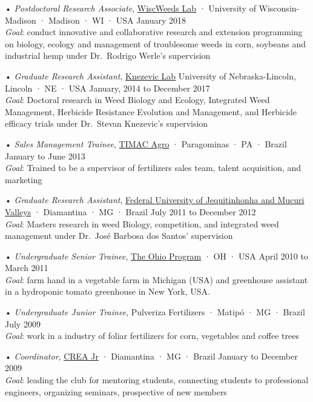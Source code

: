\documentclass[11pt,]{article}
\begin{document}
• \emph{Postdoctoral Research Associate},
\href{http://www.wiscweeds.info/}{WiscWeeds Lab} · University of
Wisconsin-Madison · Madison · WI · USA January 2018\\
\emph{Goal}: conduct innovative and collaborative research and extension
programming on biology, ecology and management of troublesome weeds in
corn, soybeans and industrial hemp under Dr.~Rodrigo Werle's supervision

• \emph{Graduate Research Assistant},
\href{https://agronomy.unl.edu/knezevic}{Knezevic Lab} University of
Nebraska-Lincoln, Lincoln · NE · USA \hfil January, 2014 to December
2017\\
\emph{Goal}: Doctoral research in Weed Biology and Ecology, Integrated
Weed Management, Herbicide Resistance Evolution and Management, and
Herbicide efficacy trials under Dr.~Stevan Knezevic's supervision

• \emph{Sales Management Trainee},
\href{http://www.timacagro.com.br/}{TIMAC Agro} · Paragominas · PA ·
Brazil \hfill January to June 2013\\
\emph{Goal}: Trained to be a supervisor of fertilizers sales team,
talent acquisition, and marketing

• \emph{Graduate Research Assistant},
\href{http://www.ufvjm.edu.br/}{Federal University of Jequitinhonha and
Mucuri Valleys} · Diamantina · MG · Brazil \hfill July 2011 to December
2012\\
\emph{Goal}: Masters research in weed Biology, competition, and
integrated weed management under Dr.~José Barbosa dos Santos'
supervision

• \emph{Undergraduate Senior Trainee}, \href{https://top.osu.edu/}{The
Ohio Program} · OH · USA \hfill April 2010 to March 2011\\
\emph{Goal}: farm hand in a vegetable farm in Michigan (USA) and
greenhouse assistant in a hydroponic tomato greenhouse in New York, USA.

• \emph{Undergraduate Junior Trainee}, Pulveriza Fertilizers · Matipó ·
MG · Brazil \hfill July 2009\\
\emph{Goal}: work in a industry of foliar fertilizers for corn,
vegetables and coffee trees

• \emph{Coordinator}, \href{https://junior.creadf.org.br/}{CREA Jr} ·
Diamantina · MG · Brazil \hfill January to December 2009\\
\emph{Goal}: leading the club for mentoring students, connecting
students to professional engineers, organizing seminars, prospective of
new members
\end{document}
